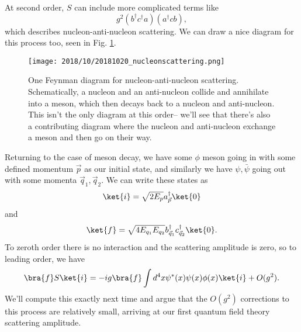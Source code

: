 At second order, $S$ can include more complicated terms like
$$g^2(b^\dagger c^\dagger a)(a^\dagger c b),$$
which describes nucleon-anti-nucleon scattering. We can draw a nice diagram for this process too, seen in Fig. \ref{fig:nucleonscattering1}.

\begin{figure}
    \centering
    \texttt{[image: 2018/10/20181020\_nucleonscattering.png]}
    \caption{One Feynman diagram for nucleon-anti-nucleon scattering. Schematically, a nucleon and an anti-nucleon collide and annihilate into a meson, which then decays back to a nucleon and anti-nucleon. This isn't the only diagram at this order-- we'll see that there's also a contributing diagram where the nucleon and anti-nucleon exchange a meson and then go on their way.}
    \label{fig:nucleonscattering1}
\end{figure}

Returning to the case of meson decay, we have some $\phi$ meson going in with some defined momentum $\vec p$ as our initial state, and similarly we have $\psi,\bar \psi$ going out with some momenta $\vec q_1,\vec q_2.$ We can write these states as
$$\ket{i}=\sqrt{2E_p}a_{\vec p}^\dagger \ket{0}$$
and
$$\ket{f}=\sqrt{4E_{q_1}E_{q_2}}b_{\vec q_1}^\dagger c_{\vec q_2}^\dagger \ket{0}.$$
To zeroth order there is no interaction and the scattering amplitude is zero, so to leading order, we have
$$\bra{f}S\ket{i}=-ig \bra{f}\int d^4 x \psi^* (x) \psi(x) \phi(x) \ket{i} + O(g^2).$$
We'll compute this exactly next time and argue that the $O(g^2)$ corrections to this process are relatively small, arriving at our first quantum field theory scattering amplitude.